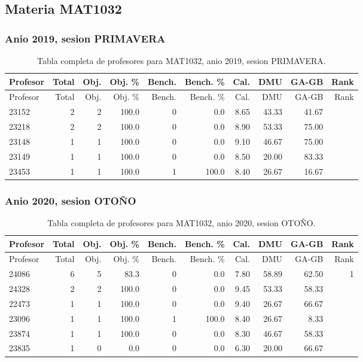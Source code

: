\subsection{Materia MAT1032}

\subsubsection{Anio 2019, sesion PRIMAVERA}

\begingroup
\scriptsize
\setlength{\tabcolsep}{3pt}
\begin{longtable}{lrrrrrrrrr}
\caption{Tabla completa de profesores para MAT1032, anio 2019, sesion PRIMAVERA.}\label{tab:prof-period-mat1032-2019-primavera}\\
\toprule
Profesor & Total & Obj. & Obj. \% & Bench. & Bench. \% & Cal. & DMU & GA-GB & Rank \\
\midrule
\endfirsthead
\toprule
Profesor & Total & Obj. & Obj. \% & Bench. & Bench. \% & Cal. & DMU & GA-GB & Rank \\
\midrule
\endhead
23152 & 2 & 2 & 100.0 & 0 & 0.0 & 8.65 & 43.33 & 41.67 &  \\
23218 & 2 & 2 & 100.0 & 0 & 0.0 & 8.90 & 53.33 & 75.00 &  \\
23148 & 1 & 1 & 100.0 & 0 & 0.0 & 9.10 & 46.67 & 75.00 &  \\
23149 & 1 & 1 & 100.0 & 0 & 0.0 & 8.50 & 20.00 & 83.33 &  \\
23453 & 1 & 1 & 100.0 & 1 & 100.0 & 8.40 & 26.67 & 16.67 &  \\
\bottomrule
\end{longtable}
\endgroup

\subsubsection{Anio 2020, sesion OTOÑO}

\begingroup
\scriptsize
\setlength{\tabcolsep}{3pt}
\begin{longtable}{lrrrrrrrrr}
\caption{Tabla completa de profesores para MAT1032, anio 2020, sesion OTOÑO.}\label{tab:prof-period-mat1032-2020-oto-o}\\
\toprule
Profesor & Total & Obj. & Obj. \% & Bench. & Bench. \% & Cal. & DMU & GA-GB & Rank \\
\midrule
\endfirsthead
\toprule
Profesor & Total & Obj. & Obj. \% & Bench. & Bench. \% & Cal. & DMU & GA-GB & Rank \\
\midrule
\endhead
24086 & 6 & 5 & 83.3 & 0 & 0.0 & 7.80 & 58.89 & 62.50 & 1 \\
24328 & 2 & 2 & 100.0 & 0 & 0.0 & 9.45 & 53.33 & 58.33 &  \\
22473 & 1 & 1 & 100.0 & 0 & 0.0 & 9.40 & 26.67 & 66.67 &  \\
23096 & 1 & 1 & 100.0 & 1 & 100.0 & 8.40 & 26.67 & 8.33 &  \\
23874 & 1 & 1 & 100.0 & 0 & 0.0 & 8.30 & 46.67 & 58.33 &  \\
23835 & 1 & 0 & 0.0 & 0 & 0.0 & 6.30 & 20.00 & 66.67 &  \\
\bottomrule
\end{longtable}
\endgroup

